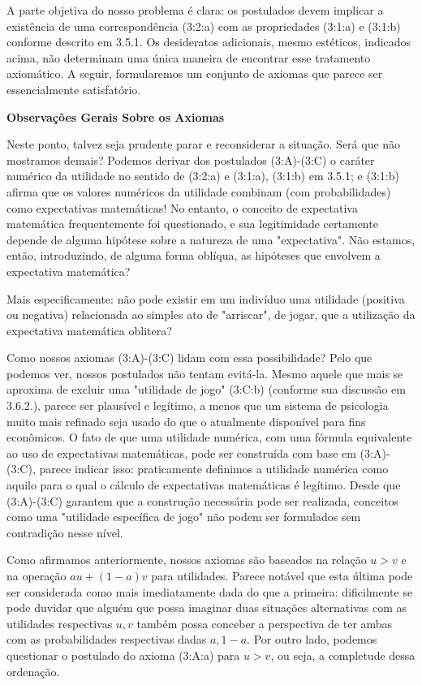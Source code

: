 \documentclass[12pt]{article}
\begin{document}
A parte objetiva do nosso problema é clara: os postulados devem implicar a existência de uma correspondência (3:2:a) com as propriedades (3:1:a) e (3:1:b) conforme descrito em 3.5.1. Os desideratos adicionais, mesmo estéticos, indicados acima, não determinam uma única maneira de encontrar esse tratamento axiomático. A seguir, formularemos um conjunto de axiomas que parece ser essencialmente satisfatório.

\textbf{Observações Gerais Sobre os Axiomas}

Neste ponto, talvez seja prudente parar e reconsiderar a situação. Será que não mostramos demais? Podemos derivar dos postulados (3:A)-(3:C) o caráter numérico da utilidade no sentido de (3:2:a) e (3:1:a), (3:1:b) em 3.5.1; e (3:1:b) afirma que os valores numéricos da utilidade combinam (com probabilidades) como expectativas matemáticas! No entanto, o conceito de expectativa matemática frequentemente foi questionado, e sua legitimidade certamente depende de alguma hipótese sobre a natureza de uma "expectativa". Não estamos, então, introduzindo, de alguma forma oblíqua, as hipóteses que envolvem a expectativa matemática?

Mais especificamente: não pode existir em um indivíduo uma utilidade (positiva ou negativa) relacionada ao simples ato de "arriscar", de jogar, que a utilização da expectativa matemática oblitera?

Como nossos axiomas (3:A)-(3:C) lidam com essa possibilidade? Pelo que podemos ver, nossos postulados não tentam evitá-la. Mesmo aquele que mais se aproxima de excluir uma "utilidade de jogo" (3:C:b) (conforme sua discussão em 3.6.2.), parece ser plausível e legítimo, a menos que um sistema de psicologia muito mais refinado seja usado do que o atualmente disponível para fins econômicos. O fato de que uma utilidade numérica, com uma fórmula equivalente ao uso de expectativas matemáticas, pode ser construída com base em (3:A)-(3:C), parece indicar isso: praticamente definimos a utilidade numérica como aquilo para o qual o cálculo de expectativas matemáticas é legítimo. Desde que (3:A)-(3:C) garantem que a construção necessária pode ser realizada, conceitos como uma "utilidade específica de jogo" não podem ser formulados sem contradição nesse nível.

Como afirmamos anteriormente, nossos axiomas são baseados na relação \(u > v\) e na operação \(au + (1 - a)v\) para utilidades. Parece notável que esta última pode ser considerada como mais imediatamente dada do que a primeira: dificilmente se pode duvidar que alguém que possa imaginar duas situações alternativas com as utilidades respectivas \(u, v\) também possa conceber a perspectiva de ter ambas com as probabilidades respectivas dadas \(a, 1 - a\). Por outro lado, podemos questionar o postulado do axioma (3:A:a) para \(u > v\), ou seja, a completude dessa ordenação.
\end{document}

